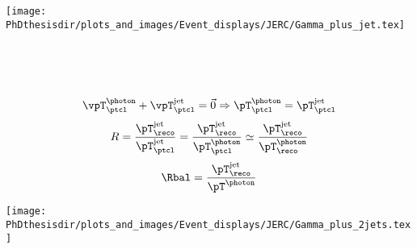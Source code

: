 %
\begin{frame}
\begin{center}
\texttt{[image: \\PhDthesisdir/plots\_and\_images/Event\_displays/JERC/Gamma\_plus\_jet.tex]}
\end{center}
\end{frame}

\begin{frame}[t]
\vspace{\baselineskip}

~\hfill

\hfill\hfill\hfill

\hfill\hfill\hfill

\hfill~

\pause
\vfill

\begin{equation*}
\vpT_\ptcl^{\photon} + \vpT_\ptcl^\text{jet} = \vec{0}
\Rightarrow
\pT_\ptcl^{\photon} = \pT_\ptcl^\text{jet}
\end{equation*}
\pause
\begin{equation*}
R
= \frac{\pT_\reco^\text{jet}}{\pT_\ptcl^\text{jet}}
= \frac{\pT_\reco^\text{jet}}{\pT_\ptcl^{\photon}}
\simeq \frac{\pT_\reco^\text{jet}}{\pT_\reco^{\photon}}
\end{equation*}
\pause
\begin{equation*}
\Rbal = \frac{\pT_\reco^\text{jet}}{\pT^{\photon}}
\end{equation*}

\end{frame}

%
\begin{frame}
\begin{center}
\texttt{[image: \\PhDthesisdir/plots\_and\_images/Event\_displays/JERC/Gamma\_plus\_2jets.tex]}
\end{center}
\end{frame}

